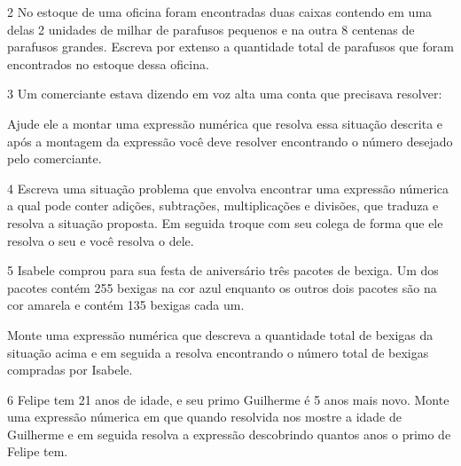 {\num{2} No estoque de uma oficina foram encontradas duas caixas contendo em
uma delas 2 unidades de milhar de parafusos pequenos e na outra 8
centenas de parafusos grandes. Escreva por extenso a quantidade total de
parafusos que foram encontrados no estoque dessa oficina.



\num{3} Um comerciante estava dizendo em voz alta uma conta que precisava
resolver:


Ajude ele a montar uma expressão numérica que resolva essa situação
descrita e após a montagem da expressão você deve resolver encontrando o
número desejado pelo comerciante.



\num{4} Escreva uma situação problema que envolva encontrar uma expressão
númerica a qual pode conter adições, subtrações, multiplicações e
divisões, que traduza e resolva a situação proposta. Em seguida troque
com seu colega de forma que ele resolva o seu e você resolva o dele.



\num{5} Isabele comprou para sua festa de aniversário três pacotes de
bexiga. Um dos pacotes contém 255 bexigas na cor azul enquanto os outros
dois pacotes são na cor amarela e contém 135 bexigas cada um.

Monte uma expressão numérica que descreva a quantidade total de bexigas
da situação acima e em seguida a resolva encontrando o número total de
bexigas compradas por Isabele.



\num{6} Felipe tem 21 anos de idade, e seu primo Guilherme é 5 anos mais
novo. Monte uma expressão númerica em que quando resolvida nos mostre a
idade de Guilherme e em seguida resolva a expressão descobrindo quantos
anos o primo de Felipe tem.

}
